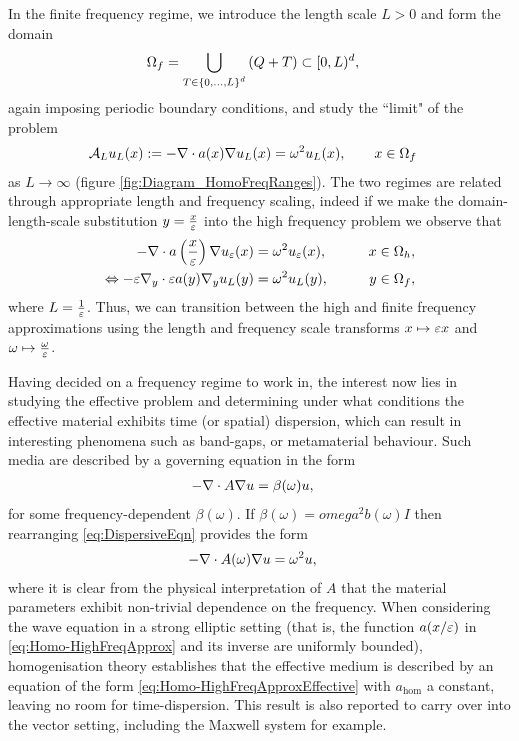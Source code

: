 In the finite frequency regime, we introduce the length scale $L>0$ and form the domain
\begin{align*}
	\Omega_f &= \bigcup_{T\in\left\{ 0,...,L \right\}^d}\left( Q + T \right)\subset[0,L)^d,
\end{align*}
again imposing periodic boundary conditions, and study the ``limit" of the problem
\begin{align*}
	\mathcal{A}_L u_L(x) &:= -\nabla\cdot a(x)\nabla u_L(x) = \omega^2 u_L(x), \qquad x\in\Omega_f
\end{align*}
as $L\rightarrow\infty$ (figure \ref{fig:Diagram_HomoFreqRanges}).
The two regimes are related through appropriate length and frequency scaling, indeed if we make the domain-length-scale substitution $y = \frac{x}{\varepsilon}$ into the high frequency problem we observe that
\begin{align*}
	-\nabla\cdot a\left( \frac{x}{\varepsilon} \right)\nabla u_{\varepsilon}(x) &= \omega^2 u_{\varepsilon}(x), &\qquad x\in\Omega_h, \\
	\Leftrightarrow -\varepsilon\nabla_{y}\cdot \varepsilon a(y)\nabla_{y}u_{L}(y) &= \omega^2 u_{L}(y), &\qquad y\in\Omega_f,
\end{align*}
where $L = \frac{1}{\varepsilon}$.
Thus, we can transition between the high and finite frequency approximations using the length and frequency scale transforms $x \mapsto \varepsilon x$ and $\omega \mapsto \frac{\omega}{\varepsilon}$.

Having decided on a frequency regime to work in, the interest now lies in studying the effective problem and determining under what conditions the effective material exhibits time (or spatial) dispersion, which can result in interesting phenomena such as band-gaps, or metamaterial behaviour.
Such media are described by a governing equation in the form
\begin{align} \label{eq:DispersiveEqn}
	-\nabla\cdot A\nabla u &= \beta(\omega)u,
\end{align}
for some frequency-dependent $\beta(\omega)$.
If $\beta(\omega) = omega^2 b(\omega)I$ then rearranging \eqref{eq:DispersiveEqn} provides the form
\begin{align} \label{eq:DispersiveEqn-FreqDepA}
	-\nabla\cdot A(\omega)\nabla u &= \omega^2 u,
\end{align}
where it is clear from the physical interpretation of $A$ that the material parameters exhibit non-trivial dependence on the frequency.
When considering the wave equation in a strong elliptic setting (that is, the function $a(x/\varepsilon)$ in \eqref{eq:Homo-HighFreqApprox} and its inverse are uniformly bounded), homogenisation theory establishes  that the effective medium is described by an equation of the form \eqref{eq:Homo-HighFreqApproxEffective} with $a_{\mathrm{hom}}$ a constant, leaving no room for time-dispersion.
This result is also reported to carry over into the vector setting, including the Maxwell system for example.

